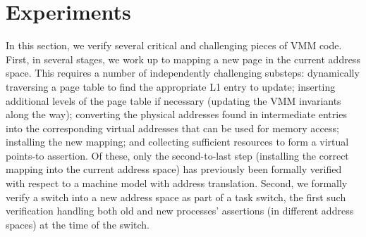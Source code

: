 \section{Experiments}
\label{sec:experiment}
In this section, we verify several critical and challenging pieces of VMM code.
First, in several stages, we work up to mapping a new page in the current address space.
This requires a number of independently challenging substeps: dynamically traversing a page table to find
the appropriate L1 entry to update; inserting additional levels of the page table if necessary (updating
the VMM invariants along the way);
converting the physical addresses found in intermediate entries into the corresponding virtual addresses
that can be used for memory access;
installing the new mapping;
and collecting sufficient resources to form a virtual points-to assertion.
Of these, only the second-to-last step (installing the correct mapping into the
current address space) has previously been formally verified with respect to a machine model with address translation.
Second, we formally verify a switch into a new address space as part of a task switch,
the first such verification handling both old and new processes' assertions (in different address spaces) at the time of the switch.


